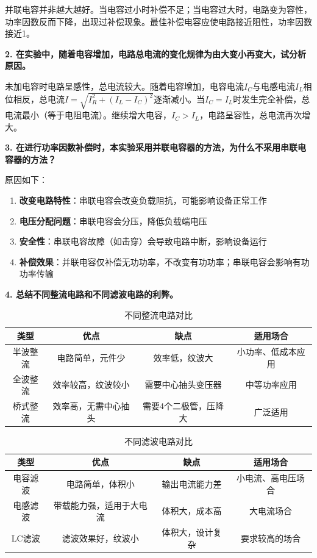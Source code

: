 \documentclass[10pt,a4paper]{ctexart}
\begin{document}
    并联电容并非越大越好。当电容过小时补偿不足；当电容过大时，电路变为容性，功率因数反而下降，出现过补偿现象。最佳补偿电容应使电路接近阻性，功率因数接近1。
    
    \textbf{2. 在实验中，随着电容增加，电路总电流的变化规律为由大变小再变大，试分析原因。}
    
    未加电容时电路呈感性，总电流较大。随着电容增加，电容电流$I_C$与电感电流$I_L$相位相反，总电流$I=\sqrt{I_R^2+(I_L-I_C)^2}$逐渐减小。当$I_C=I_L$时发生完全补偿，总电流最小（等于电阻电流）。继续增大电容，$I_C>I_L$，电路呈容性，总电流再次增大。
    
    \textbf{3. 在进行功率因数补偿时，本实验采用并联电容器的方法，为什么不采用串联电容器的方法？}
    
    原因如下：
    \begin{enumerate}
        \item \textbf{改变电路特性}：串联电容会改变负载阻抗，可能影响设备正常工作
        \item \textbf{电压分配问题}：串联电容会分压，降低负载端电压
        \item \textbf{安全性}：串联电容故障（如击穿）会导致电路中断，影响设备运行
        \item \textbf{补偿效果}：并联电容仅补偿无功功率，不改变有功功率；串联电容会影响有功功率传输
    \end{enumerate}
    
    \textbf{4. 总结不同整流电路和不同滤波电路的利弊。}
    
    \begin{table}[H]
    \centering
    \caption{不同整流电路对比}
    \begin{tabular}{|c|c|c|c|}
    \hline
    类型 & 优点 & 缺点 & 适用场合 \\ \hline
    半波整流 & 电路简单，元件少 & 效率低，纹波大 & 小功率、低成本应用 \\ \hline
    全波整流 & 效率较高，纹波较小 & 需要中心抽头变压器 & 中等功率应用 \\ \hline
    桥式整流 & 效率高，无需中心抽头 & 需要4个二极管，压降大 & 广泛适用 \\ \hline
    \end{tabular}
    \end{table}
    
    \begin{table}[H]
    \centering
    \caption{不同滤波电路对比}
    \begin{tabular}{|c|c|c|c|}
    \hline
    类型 & 优点 & 缺点 & 适用场合 \\ \hline
    电容滤波 & 电路简单，体积小 & 输出电流能力差 & 小电流、高电压场合 \\ \hline
    电感滤波 & 带载能力强，适用于大电流 & 体积大，成本高 & 大电流场合 \\ \hline
    LC滤波 & 滤波效果好，纹波小 & 体积大，设计复杂 & 要求较高的场合 \\ \hline
    \end{tabular}
    \end{table}
    
\end{document}
